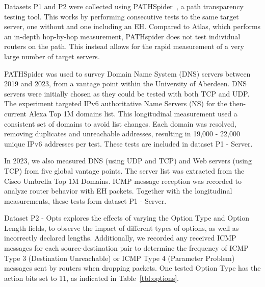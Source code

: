 \documentclass[conference]{IEEEtran}
\begin{document}
Datasets P1 and P2 were collected using
PATHSpider~\cite{learmonth2016pathspider}, a path transparency testing tool. This works by performing consecutive tests to the same target server, one without and one including an EH.
Compared to Atlas, which performs an in-depth hop-by-hop measurement, PATHspider does not test individual routers on the path. This instead allows for the rapid measurement of a very large number of target servers.

PATHSpider was used to survey Domain Name System (DNS) servers between 2019 and 2023, from a vantage point within the University of Aberdeen. DNS servers were initially chosen as they could be tested with both TCP and UDP.
The experiment targeted IPv6 authoritative Name Servers (NS) for the
then-current Alexa Top 1M domains list. This longitudinal measurement used a consistent set of domains to avoid list changes. Each domain was resolved, removing duplicates and unreachable addresses, resulting
in 19,000 - 22,000 unique IPv6 addresses per test. These tests are included in dataset P1 - Server.

In 2023, we also measured DNS (using UDP and TCP) and Web servers (using TCP) 
from five global vantage points.
The server list was extracted from the Cisco Umbrella Top 1M Domains. ICMP message reception was recorded to analyze router behavior with EH packets. Together with the longitudinal measurements, these tests form dataset P1 - Server.



Dataset P2 - Opts explores the effects of varying
the Option Type and Option Length fields, to observe the impact of
different types of options, as well as incorrectly declared lengths. Additionally, we recorded any received ICMP messages for each
source-destination pair to determine the frequency of ICMP Type 3 (Destination
Unreachable) or ICMP Type 4 (Parameter Problem) messages sent by routers when
dropping packets. One tested
Option Type has the action bits set to 11, as indicated in
Table~\ref{tbl:options}.
\end{document}
